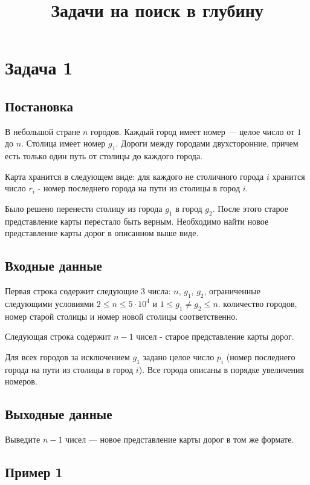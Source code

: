 \documentclass{extarticle}
\date{}
\title{Задачи на поиск в глубину}
\begin{document}
\section*{Задача 1}
\label{sec:org5674a7c}
\subsection*{Постановка}
\label{sec:org66a8cf1}

В небольшой стране \(n\) городов.
Каждый город имеет номер — целое число от \(1\) до \(n\).
Столица имеет номер \(g_{1}\).
Дороги между городами двухсторонние, причем
есть только один путь от столицы до каждого города.

Карта хранится в следующем виде:
для каждого не столичного города \(i\) хранится число \(r_{i}\) -
номер последнего города на пути из столицы в город \(i\).

Было решено перенести столицу из города \(g_{1}\) в город \(g_{2}\).
После этого старое представление карты перестало быть верным.
Необходимо найти новое представление карты дорог в описанном выше виде.

\subsection*{Входные данные}
\label{sec:org35265fc}

Первая строка содержит следующие 3 числа:
\(n\), \(g_{1}\), \(g_{2}\),
ограниченные следующими условиями
\(2 \leq n \leq 5 \cdot 10^{4}\) и \(1 \leq g_{1} \neq g_{2} \leq n\).
количество городов,
номер старой столицы и номер новой столицы соответственно.

Следующая строка содержит \(n-1\) чисел - старое представление карты дорог.

Для всех городов за исключением \(g_{1}\) задано целое число \(p_{i}\)
(номер последнего города на пути из столицы в город \(i\)).
Все города описаны в порядке увеличения номеров.

\subsection*{Выходные данные}
\label{sec:orgbd2e2ba}

Выведите \(n - 1\) чисел — новое представление карты дорог в том же формате.

\subsection*{Пример 1}
\label{sec:org4b0b869}
\end{document}
